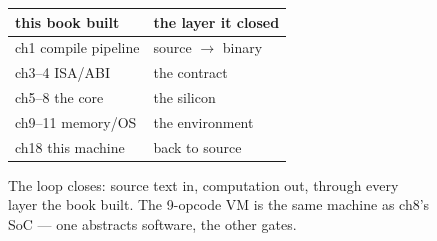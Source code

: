 \begin{figure}[htbp]
\centering
\begin{tabular}{ll}
\toprule
this book built & the layer it closed \\
\midrule
ch1 compile pipeline & source $\to$ binary \\
ch3--4 ISA/ABI & the contract \\
ch5--8 the core & the silicon \\
ch9--11 memory/OS & the environment \\
ch18 this machine & back to source \\
\bottomrule
\end{tabular}
\caption{The loop closes: source text in, computation out, through
every layer the book built. The 9-opcode VM is the same machine as
ch8's SoC --- one abstracts software, the other gates.}
\label{fig:full18}
\end{figure}
